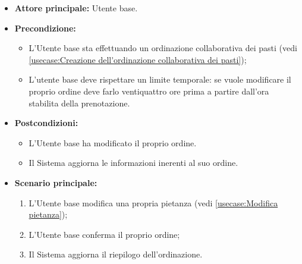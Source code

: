 \label{usecase:Modifica della propria ordinazione}
\begin{itemize}
	\item \textbf{Attore principale:} Utente base.

	\item \textbf{Precondizione:} 
	\begin{itemize}
		\item L'Utente base sta effettuando un ordinazione collaborativa dei pasti (vedi \autoref{usecase:Creazione dell'ordinazione collaborativa dei pasti});
		\item L'utente base deve rispettare un limite temporale: se vuole modificare il proprio ordine deve farlo ventiquattro ore prima a partire dall'ora stabilita della prenotazione.
	\end{itemize}

	\item \textbf{Postcondizioni:}
		\begin{itemize}
			\item L'Utente base ha modificato il proprio ordine.
			\item Il Sistema aggiorna le informazioni inerenti al suo ordine.
		\end{itemize}

	\item \textbf{Scenario principale:}
	      \begin{enumerate}
		      \item L'Utente base modifica una propria pietanza (vedi \autoref{usecase:Modifica pietanza});
		      \item L'Utente base conferma il proprio ordine;
		      \item Il Sistema aggiorna il riepilogo dell'ordinazione.
	      \end{enumerate}
\end{itemize}

